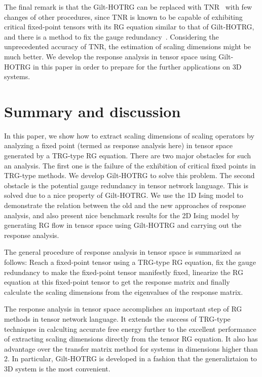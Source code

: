 \documentclass[aps,prb,reprint,superscriptaddress]{revtex4-2}
\begin{document}
The final remark is that the Gilt-HOTRG can be replaced with
TNR~\cite{tnr,tnralgo} with few changes of other procedures, since TNR
is known to be capable of exhibiting critical fixed-point tensors with
its RG equation similar to that of Gilt-HOTRG, and there is a method to
fix the gauge redundancy~\cite{tnralgo}. Considering the unprecedented
accuracy of TNR, the estimation of scaling dimensions might be much
better. We develop the response analysis in tensor space using
Gilt-HOTRG in this paper in order to prepare for the further
applications on 3D systems.
%


\section{Summary and discussion\label{conclusion}}
In this paper, we show how to extract scaling dimensions of scaling
operators by analyzing a fixed point (termed as response analysis
here) in tensor space generated by a TRG-type RG equation. There are two
major obstacles for such an analysis. The first one is the failure of
the exhibition of critical fixed points in TRG-type methods. We develop
Gilt-HOTRG to solve this problem. The second obstacle is the potential
gauge redundancy in tensor network language. This is solved due to a
nice property of Gilt-HOTRG.  We use the 1D Ising model to demonstrate
the relation between the old and the new approaches of response
analysis, and also present nice benchmark results for the 2D Ising model
by generating RG flow in tensor space using Gilt-HOTRG and carrying out
the response analysis. 
%

The general procedure of response analysis in tensor space is summarized
as follows: Reach a fixed-point tensor using a TRG-type RG equation, fix
the gauge redundancy to make the fixed-point tensor manifestly fixed,
linearize the RG equation at this fixed-point tensor to get the response
matrix and finally calculate the scaling dimensions from the
eigenvalues of the response matrix.
%

The response analysis in tensor space accomplishes an important step of
RG methods in tensor network language. It extends the success of
TRG-type techniques in calculting accurate free energy further to
the excellent performance of extracting scaling dimensions directly from
the tensor RG equation. It also has advantage over the transfer matrix
method for systems in dimensions higher than 2. In particular,
Gilt-HOTRG is developed in a fashion that the generaliztaion to 3D
system is the most convenient.
\end{document}
